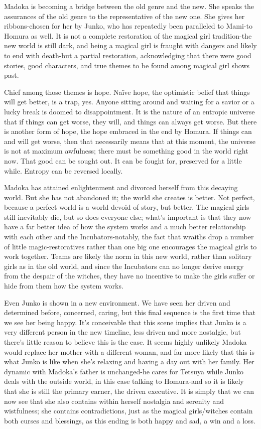 Madoka is becoming a bridge between the old genre and the new. She speaks the assurances of the old genre to the representative of the new one. She gives her ribbons-chosen for her by Junko, who has repeatedly been paralleled to Mami-to Homura as well. It is not a complete restoration of the magical girl tradition-the new world is still dark, and being a magical girl is fraught with dangers and likely to end with death-but a partial restoration, acknowledging that there were good stories, good characters, and true themes to be found among magical girl shows past.

Chief among those themes is hope. Naïve hope, the optimistic belief that things will get better, is a trap, yes. Anyone sitting around and waiting for a savior or a lucky break is doomed to disappointment. It is the nature of an entropic universe that if things can get worse, they will, and things can always get worse. But there is another form of hope, the hope embraced in the end by Homura. If things can and will get worse, then that necessarily means that at this moment, the universe is not at maximum awfulness; there must be something good in the world right now. That good can be sought out. It can be fought for, preserved for a little while. Entropy can be reversed locally. 

Madoka has attained enlightenment and divorced herself from this decaying world. But she has not abandoned it; the world she creates is better. Not perfect, because a perfect world is a world devoid of story, but better. The magical girls still inevitably die, but so does everyone else; what's important is that they now have a far better idea of how the system works and a much better relationship with each other and the Incubators-notably, the fact that wraiths drop a number of little magic-restoratives rather than one big one encourages the magical girls to work together. Teams are likely the norm in this new world, rather than solitary girls as in the old world, and since the Incubators can no longer derive energy from the despair of the witches, they have no incentive to make the girls suffer or hide from them how the system works.

Even Junko is shown in a new environment. We have seen her driven and determined before, concerned, caring, but this final sequence is the first time that we see her being happy. It's conceivable that this scene implies that Junko is a very different person in the new timeline, less driven and more nostalgic, but there's little reason to believe this is the case. It seems highly unlikely Madoka would replace her mother with a different woman, and far more likely that this is what Junko is like when she's relaxing and having a day out with her family. Her dynamic with Madoka's father is unchanged-he cares for Tetsuya while Junko deals with the outside world, in this case talking to Homura-and so it is likely that she is still the primary earner, the driven executive. It is simply that we can now see that she also contains within herself nostalgia and serenity and wistfulness; she contains contradictions, just as the magical girls/witches contain both curses and blessings, as this ending is both happy and sad, a win and a loss.

